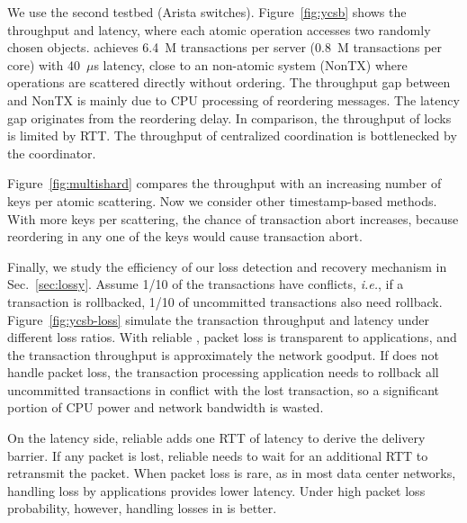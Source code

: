 We use the second testbed (Arista switches).
Figure~\ref{fig:ycsb} shows the throughput and latency, where each atomic operation accesses two randomly chosen objects.
\sys achieves 6.4~M transactions per server (0.8~M transactions per core) with 40~$\mu$s latency, close to an non-atomic system (NonTX) where operations are scattered directly without ordering.
The throughput gap between \sys and NonTX is mainly due to CPU processing of reordering messages.
The latency gap originates from the reordering delay.
In comparison, the throughput of locks is limited by RTT.
The throughput of centralized coordination is bottlenecked by the coordinator.

Figure~\ref{fig:multishard} compares the throughput  with an increasing number of keys per atomic scattering.
Now we consider other timestamp-based methods.
With more keys per scattering, the chance of transaction abort increases, because reordering in any one of the keys would cause transaction abort.


Finally, we study the efficiency of our loss detection and recovery mechanism in Sec.~\ref{sec:lossy}.
Assume 1/10 of the transactions have conflicts, \textit{i.e.}, if a transaction is rollbacked, 1/10 of uncommitted transactions also need rollback.
Figure~\ref{fig:ycsb-loss} simulate the transaction throughput and latency under different loss ratios.
With reliable \sys, packet loss is transparent to applications, and the transaction throughput is approximately the network goodput.
If \sys does not handle packet loss, the transaction processing application needs to rollback all uncommitted transactions in conflict with the lost transaction, so a significant portion of CPU power and network bandwidth is wasted.

On the latency side, reliable \sys adds one RTT of latency to derive the delivery barrier.
If any packet is lost, reliable \sys needs to wait for an additional RTT to retransmit the packet.
When packet loss is rare, as in most data center networks, handling loss by applications provides lower latency.
Under high packet loss probability, however, handling losses in \sys is better.

